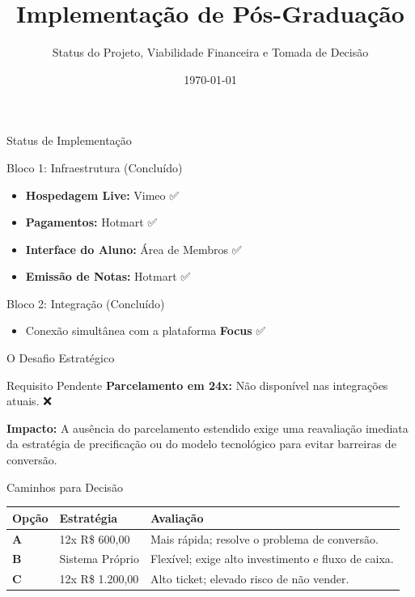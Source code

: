 \documentclass[10pt]{beamer}
\title{Implementação de Pós-Graduação}
\subtitle{Status do Projeto, Viabilidade Financeira e Tomada de Decisão}
\author{}
\date{\today}
\begin{document}
\maketitle

\begin{frame}{Status de Implementação}
    \begin{block}{Bloco 1: Infraestrutura (Concluído)}
        \begin{itemize}
            \item \textbf{Hospedagem Live:} Vimeo ✅
            \item \textbf{Pagamentos:} Hotmart ✅
            \item \textbf{Interface do Aluno:} Área de Membros ✅
            \item \textbf{Emissão de Notas:} Hotmart ✅
        \end{itemize}
    \end{block}

    \begin{block}{Bloco 2: Integração (Concluído)}
        \begin{itemize}
            \item Conexão simultânea com a plataforma \textbf{Focus} ✅
        \end{itemize}
    \end{block}
\end{frame}

\begin{frame}{O Desafio Estratégico}
    \begin{alertblock}{Requisito Pendente}
        \textbf{Parcelamento em 24x:} Não disponível nas integrações atuais. ❌
    \end{alertblock}

    \vspace{0.5cm}
    \textbf{Impacto:} 
    A ausência do parcelamento estendido exige uma reavaliação imediata da estratégia de precificação ou do modelo tecnológico para evitar barreiras de conversão.
\end{frame}

\begin{frame}{Caminhos para Decisão}
    \begin{table}[]
        \centering
        \small
        \begin{tabular}{lp{3cm}p{3.5cm}}
            \toprule
            \textbf{Opção} & \textbf{Estratégia} & \textbf{Avaliação} \\ \midrule
            \textbf{A} & 12x R\$ 600,00 & Mais rápida; resolve o problema de conversão. \\ \midrule
            \textbf{B} & Sistema Próprio & Flexível; exige alto investimento e fluxo de caixa. \\ \midrule
            \textbf{C} & 12x R\$ 1.200,00 & Alto ticket; elevado risco de não vender. \\ \bottomrule
        \end{tabular}
    \end{table}
\end{frame}
\end{document}
